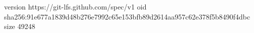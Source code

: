 version https://git-lfs.github.com/spec/v1
oid sha256:91e677a1839d48b276e7992c65e153bfb89d2614aa957c62e378f5b8490f4dbc
size 49248
